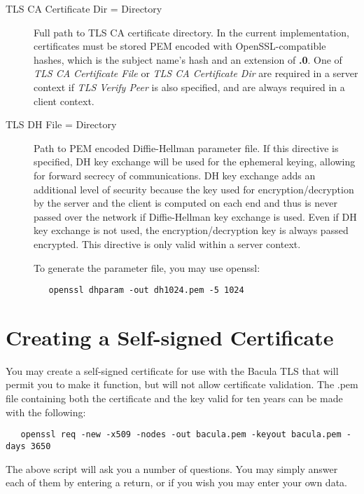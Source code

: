 \begin{description}
\item [TLS CA Certificate Dir = \lt{}Directory\gt{}]
Full path to TLS CA certificate directory.  In the current implementation,
certificates must be stored PEM encoded with OpenSSL-compatible hashes,
which is the subject name's hash and an extension of {\bf .0}.
One of \emph{TLS CA Certificate File} or \emph{TLS CA Certificate Dir} are
required in a server context if \emph{TLS Verify Peer} is also specified,
and are always required in a client context.

\item [TLS DH File = \lt{}Directory\gt{}]
Path to PEM encoded Diffie-Hellman parameter file.  If this directive is
specified, DH key exchange will be used for the ephemeral keying, allowing
for forward secrecy of communications.  DH key exchange adds an additional
level of security because the key used for encryption/decryption by the
server and the client is computed on each end and thus is never passed over
the network if Diffie-Hellman key exchange is used.  Even if DH key
exchange is not used, the encryption/decryption key is always passed
encrypted.  This directive is only valid within a server context.

To generate the parameter file, you
may use openssl:

\begin{verbatim} 
   openssl dhparam -out dh1024.pem -5 1024 
\end{verbatim}

\end{description}

\section{Creating a Self-signed Certificate}

You may create a self-signed certificate for use with the Bacula TLS that
will permit you to make it function, but will not allow certificate
validation.  The .pem file containing both the certificate and the key
valid for ten years can be made with the following:

\footnotesize
\begin{verbatim}
   openssl req -new -x509 -nodes -out bacula.pem -keyout bacula.pem -days 3650
\end{verbatim}
\normalsize

The above script will ask you a number of questions. You may simply answer
each of them by entering a return, or if you wish you may enter your own data.

